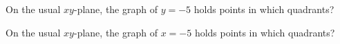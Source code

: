 \documentclass{ximera}
\begin{document}
\begin{exercise}
\begin{question}
\end{question}







\begin{question} 


On the usual $xy$-plane, the graph of $y = -5$ holds points in which quadrants?
\begin{selectAll}
\end{selectAll}

\end{question}








\begin{question} 


On the usual $xy$-plane, the graph of $x = -5$ holds points in which quadrants?
\begin{selectAll}
\end{selectAll}

\end{question}






\end{exercise}
\end{document}
